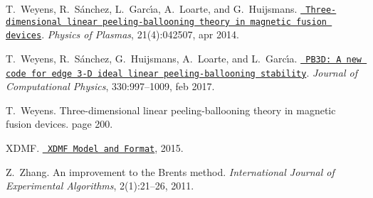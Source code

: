 \begin{DoxyDescription}
\item[\label{citelist_CITEREF_weyens2014theory}%
\Hypertarget{citelist_CITEREF_weyens2014theory}%
\mbox{[}15\mbox{]}]T.~Weyens, R.~S\'{a}nchez, L.~Garc\'{\i}a, A.~Loarte, and G.~Huijsmans. \href{http://aip.scitation.org/doi/10.1063/1.4871859}{\texttt{ Three-\/dimensional linear peeling-\/ballooning theory in magnetic fusion devices}}. {\itshape Physics of Plasmas}, 21(4)\+:042507, apr 2014. 


\item[\label{citelist_CITEREF_Weyens2017PB3D}%
\Hypertarget{citelist_CITEREF_Weyens2017PB3D}%
\mbox{[}16\mbox{]}]T.~Weyens, R.~S\'{a}nchez, G.~Huijsmans, A.~Loarte, and L.~Garc\'{\i}a. \href{http://linkinghub.elsevier.com/retrieve/pii/S0021999116305629}{\texttt{ P\+B3\+D\+: A new code for edge 3-\/D ideal linear peeling-\/ballooning stability}}. {\itshape Journal of Computational Physics}, 330\+:997--1009, feb 2017. 


\item[\label{citelist_CITEREF_Weyens3D}%
\Hypertarget{citelist_CITEREF_Weyens3D}%
\mbox{[}17\mbox{]}]T.~Weyens. Three-\/dimensional linear peeling-\/ballooning theory in magnetic fusion devices. page 200.


\item[\label{citelist_CITEREF_xdmf}%
\Hypertarget{citelist_CITEREF_xdmf}%
\mbox{[}18\mbox{]}]X\+D\+MF. \href{http://www.xdmf.org/index.php/XDMF_Model_and_Format}{\texttt{ X\+D\+MF Model and Format}}, 2015.


\item[\label{citelist_CITEREF_zhang2011improvement}%
\Hypertarget{citelist_CITEREF_zhang2011improvement}%
\mbox{[}19\mbox{]}]Z.~Zhang. An improvement to the Brent\textquotesingle{}s method. {\itshape International Journal of Experimental Algorithms}, 2(1)\+:21--26, 2011.


\end{DoxyDescription}